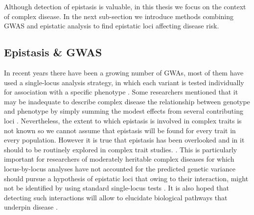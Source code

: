 
Although detection of epistasis is valuable, in this thesis we focus on the context of complex disease.
In the next sub-section we introduce methods combining GWAS and epistatic analysis to find epistatic loci affecting disease risk.

\subsection{Epistasis \& GWAS}

In recent years there have been a growing number of GWAs, most of them have used a single-locus analysis strategy, in which each variant is tested individually for association with a specific phenotype \cite{cordell2009detecting}.
Some researchers mentioned that it may be inadequate to describe complex disease the relationship between genotype and phenotype by simply summing the modest effects from several contributing loci \cite{culverhouse2002perspective}.
Nevertheless, the extent to which epistasis is involved in complex traits is not known so we cannot assume that epistasis will be found for every trait in every population. \cite{carlborg2004epistasis}
However it is true that epistasis has been overlooked and in it should to be routinely explored in complex trait studies.  \cite{carlborg2004epistasis}.
This is particularly important for researchers of moderately heritable complex diseases for which locus-by-locus analyses have not accounted for the predicted genetic variance should pursue a hypothesis of epistatic loci \cite{culverhouse2002perspective} that owing to their interaction, might not be identified by using standard single-locus tests \cite{cordell2009detecting}.
It is also hoped that detecting such interactions will allow to elucidate biological pathways that underpin disease \cite{cordell2009detecting}.


